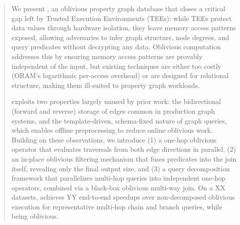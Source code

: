 \begin{abstract}
We present \system, an oblivious property graph database that closes a 
critical gap left by Trusted Execution Environments (TEEs): while TEEs 
protect data values through hardware isolation, they leave memory access 
patterns exposed, allowing adversaries to infer graph structure, node 
degrees, and query predicates without decrypting any data. Oblivious computation addresses this by 
ensuring memory access patterns are provably independent of the input, but 
existing techniques are either too costly (ORAM's logarithmic per-access 
overhead) or are designed for relational structure, making them ill-suited to property graph workloads.

\system exploits two properties largely unused by prior work: the 
bidirectional (forward and reverse) storage of edges common in production 
graph systems, and the template-driven, schema-fixed nature of graph 
queries, which enables offline preprocessing to reduce online oblivious 
work. Building on these observations, we introduce (1) a one-hop oblivious 
operator that evaluates traversals from both edge directions in parallel, 
(2) an in-place oblivious filtering mechanism that fuses predicates into the 
join itself, revealing only the final output size, and (3) a query 
decomposition framework that parallelizes multi-hop queries into independent 
one-hop operators, combined via a black-box oblivious multi-way join. On a 
XX datasets, \system achieves YY 
end-to-end speedups over non-decomposed oblivious execution for 
representative multi-hop chain and branch queries, while being
oblivious.
\end{abstract}